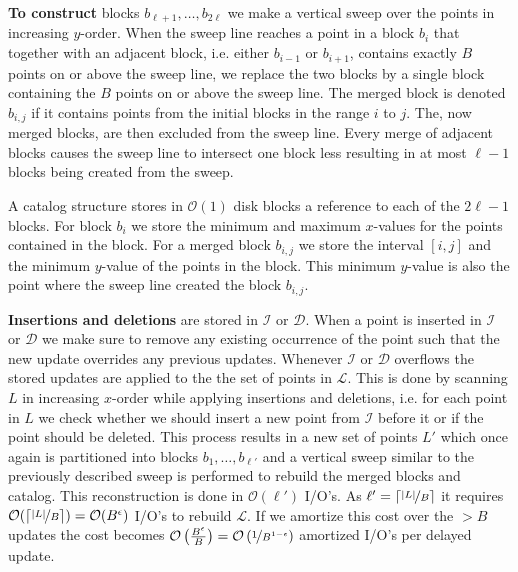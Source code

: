 \documentclass[twoside,11pt,openright]{report}
\begin{document}
\textbf{To construct} blocks $b_{\ell+1},\dots,b_{2\ell}$ we make a vertical sweep over the points in increasing $y$-order. When the sweep line reaches a point in a block $b_i$ that together with an adjacent block, i.e. either $b_{i-1}$ or $b_{i+1}$, contains exactly $B$ points on or above the sweep line, we replace the two blocks by a single block containing the $B$ points on or above the sweep line.  The merged block is denoted $b_{i,j}$ if it contains points from the initial blocks in the range $i$ to $j$. The, now merged blocks, are then excluded from the sweep line. Every merge of adjacent blocks causes the sweep line to intersect one block less resulting in at most $\ell-1$ blocks being created from the sweep.

A catalog structure stores in $\mathcal{O}(1)$ disk blocks a reference to each of the $2\ell-1$ blocks. For block $b_i$ we store the minimum and maximum $x$-values for the points contained in the block. For a merged block $b_{i,j}$ we store the interval $\left[ i,j\right]$ and the minimum $y$-value of the points in the block. This minimum $y$-value is also the point where the sweep line created the block $b_{i,j}$.


\textbf{Insertions and deletions} are stored in $\mathcal{I}$ or $\mathcal{D}$. When a point is inserted in $\mathcal{I}$ or $\mathcal{D}$ we make sure to remove any existing occurrence of the point such that the new update overrides any previous updates. Whenever $\mathcal{I}$ or $\mathcal{D}$ overflows the stored updates are applied to the the set of points in $\mathcal{L}$. This is done by scanning $L$ in increasing $x$-order while applying insertions and deletions, i.e. for each point in $L$ we check whether we should insert a new point from $\mathcal{I}$ before it or if the point should be deleted. This process results in a new set of points $L'$ which once again is partitioned into blocks $b_1,\dots,b_{\ell'}$ and a vertical sweep similar to the previously described sweep is performed to rebuild the merged blocks and catalog.
This reconstruction is done in $\mathcal{O}(\ell')$ I/O's. As $\ell' = \lceil \nicefrac{\vert L \vert}{B}\rceil$ it requires $\mathcal{O}(\lceil \nicefrac{\vert L \vert}{B}\rceil) = \mathcal{O}(B^\epsilon)$ I/O's to rebuild $\mathcal{L}$. If we amortize this cost over the $>B$ updates the cost becomes $\mathcal{O}\left(\frac{B^\epsilon}{B}\right) = \mathcal{O}\left(\nicefrac{1}{B^{1-\epsilon}}\right)$ amortized I/O's per delayed update.
\end{document}
